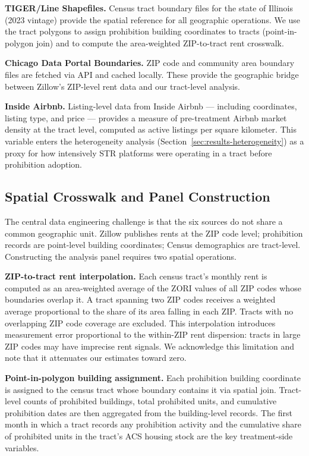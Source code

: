 \textbf{TIGER/Line Shapefiles.} Census tract boundary files for the state of Illinois (2023 vintage) provide the spatial reference for all geographic operations. We use the tract polygons to assign prohibition building coordinates to tracts (point-in-polygon join) and to compute the area-weighted ZIP-to-tract rent crosswalk.

\textbf{Chicago Data Portal Boundaries.} ZIP code and community area boundary files are fetched via API and cached locally. These provide the geographic bridge between Zillow's ZIP-level rent data and our tract-level analysis.

\textbf{Inside Airbnb.} Listing-level data from Inside Airbnb --- including coordinates, listing type, and price --- provides a measure of pre-treatment Airbnb market density at the tract level, computed as active listings per square kilometer. This variable enters the heterogeneity analysis (Section~\ref{sec:results-heterogeneity}) as a proxy for how intensively STR platforms were operating in a tract before prohibition adoption.

\subsection{Spatial Crosswalk and Panel Construction}\label{sec:data-construction}

The central data engineering challenge is that the six sources do not share a common geographic unit. Zillow publishes rents at the ZIP code level; prohibition records are point-level building coordinates; Census demographics are tract-level. Constructing the analysis panel requires two spatial operations.

\textbf{ZIP-to-tract rent interpolation.} Each census tract's monthly rent is computed as an area-weighted average of the ZORI values of all ZIP codes whose boundaries overlap it. A tract spanning two ZIP codes receives a weighted average proportional to the share of its area falling in each ZIP. Tracts with no overlapping ZIP code coverage are excluded. This interpolation introduces measurement error proportional to the within-ZIP rent dispersion: tracts in large ZIP codes may have imprecise rent signals. We acknowledge this limitation and note that it attenuates our estimates toward zero.

\textbf{Point-in-polygon building assignment.} Each prohibition building coordinate is assigned to the census tract whose boundary contains it via spatial join. Tract-level counts of prohibited buildings, total prohibited units, and cumulative prohibition dates are then aggregated from the building-level records. The first month in which a tract records any prohibition activity and the cumulative share of prohibited units in the tract's ACS housing stock are the key treatment-side variables.


